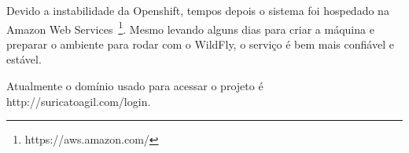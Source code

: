 Devido a instabilidade da Openshift, tempos depois o sistema foi hospedado na Amazon Web Services~\footnote{https://aws.amazon.com/}. Mesmo levando alguns dias para criar a máquina e preparar o ambiente para rodar com o WildFly, o serviço é bem mais confiável e estável.

Atualmente o domínio usado para acessar o projeto é http://suricatoagil.com/login.